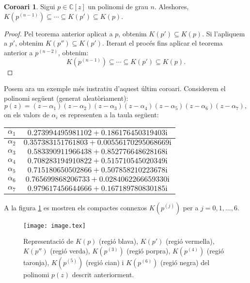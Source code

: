 \documentclass[11pt,a4paper]{article}
\theoremstyle{definition}
\newtheorem{corollary}[theorem]{Coro\lgem ari}
\newcommand{\CC}{\ensuremath{\mathbb{C}}}
\begin{document}
\begin{corollary}\label{coro}
    Sigui $p\in\CC[z]$ un polinomi de grau $n$. Aleshores, $K(p^{(n-1)})\subseteq \cdots\subseteq K(p')\subseteq K(p)$. \cite{2}
\end{corollary}
\begin{proof}
    Pel teorema anterior aplicat a $p$, obtenim $K(p')\subseteq K(p)$. Si l'apliquem a $p'$, obtenim $K(p'')\subseteq K(p')$. Iterant el procés fins aplicar el teorema anterior a $p^{(n-2)}$, obtenim: $$K(p^{(n-1)})\subseteq \cdots\subseteq K(p')\subseteq K(p).$$
\end{proof}
Posem ara un exemple més i\lgem ustratiu d'aquest últim coro\lgem ari. Considerem el polinomi següent (generat aleatòriament): $$p(z)=(z - \alpha_1)(z - \alpha_2)(z - \alpha_3)(z - \alpha_4)(z - \alpha_5)(z - \alpha_6)(z - \alpha_7),$$ on els valors de $\alpha_i$ es representen a la taula següent:
\begin{table}[ht]
    \centering
    \begin{tabular}{|c|c|}
        \hline
        $\alpha_1$ & $0.273994495981102 + 0.186176450319403\mathrm{i}$   \\
        \hline
        $\alpha_2$ & $0.357383151761803 + 0.00556170295068669\mathrm{i}$ \\
        \hline
        $\alpha_3$ & $0.583390911966438 + 0.852776648628168\mathrm{i}$   \\
        \hline
        $\alpha_4$ & $0.708283194910822 + 0.515710545020349\mathrm{i}$   \\
        \hline
        $\alpha_5$ & $0.715180650502866 + 0.507858210223678\mathrm{i}$   \\
        \hline
        $\alpha_6$ & $0.765699868206733 + 0.0284062266659330\mathrm{i}$  \\
        \hline
        $\alpha_7$ & $0.979617456644666 + 0.167189780830185\mathrm{i}$   \\
        \hline
    \end{tabular}
\end{table}\par
A la figura \ref{image1} es mostren els compactes connexos $K(p^{(j)})$ per a $j=0,1,\ldots,6$.
\begin{figure}[ht]
    \centering
    \texttt{[image: image.tex]}
    \caption{Representació de $K(p)$ (regió blava), $K(p')$ (regió vermella), $K(p'')$ (regió verda), $K(p^{(3)})$ (regió porpra), $K(p^{(4)})$ (regió taronja), $K(p^{(5)})$ (regió cian) i $K(p^{(6)})$ (regió negra) del polinomi $p(z)$ descrit anteriorment.}
    \label{image1}
\end{figure}
\end{document}
